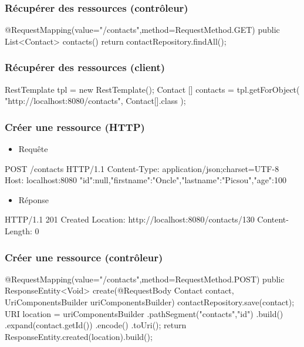 \begin{frame}[fragile]
 \frametitle{Récupérer des ressources (contrôleur)}

 \begin{javacode}
@RequestMapping(value="/contacts",method=RequestMethod.GET)
public List<Contact> contacts() {
  return contactRepository.findAll();
}
 \end{javacode}

\end{frame}

\begin{frame}[fragile]
 \frametitle{Récupérer des ressources (client)}

 \begin{javacode}
RestTemplate tpl = new RestTemplate();
Contact [] contacts = tpl.getForObject(
  "http://localhost:8080/contacts",
  Contact[].class
);
 \end{javacode}

\end{frame}

\begin{frame}[fragile]
 \frametitle{Créer une ressource (HTTP)}

 \begin{itemize}
  \item Requête
 \end{itemize}

 \begin{textcode}
POST /contacts HTTP/1.1
Content-Type: application/json;charset=UTF-8
Host: localhost:8080
{"id":null,"firstname":"Oncle","lastname":"Picsou","age":100}
 \end{textcode}

  \begin{itemize}
  \item Réponse
 \end{itemize}

 \begin{textcode}
HTTP/1.1 201 Created
Location: http://localhost:8080/contacts/130
Content-Length: 0
 \end{textcode}

\end{frame}

\begin{frame}[fragile]
 \frametitle{Créer une ressource (contrôleur)}

 \begin{javacode}
@RequestMapping(value="/contacts",method=RequestMethod.POST)
public ResponseEntity<Void> create(@RequestBody Contact contact,
                          UriComponentsBuilder uriComponentsBuilder) {
  contactRepository.save(contact);
 	URI location = uriComponentsBuilder
    .pathSegment("contacts","{id}")
    .build()
    .expand(contact.getId())
    .encode()
    .toUri();
 	return ResponseEntity.created(location).build();
}
 \end{javacode}

\end{frame}

